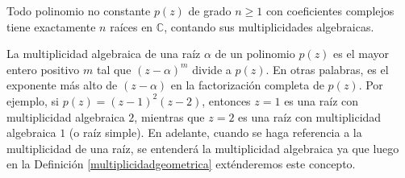 \begin{theorem}\label{tfam}
Todo polinomio no constante $p(z)$ de grado $n \geq 1$ con coeficientes complejos tiene exactamente $n$ raíces en $\mathbb{C}$, contando sus multiplicidades algebraicas.
\end{theorem}

\begin{rem}
La multiplicidad algebraica de una raíz $\alpha$ de un polinomio $p(z)$ es el mayor entero positivo $m$ tal que $(z-\alpha)^m$ divide a $p(z)$. En otras palabras, es el exponente más alto de $(z-\alpha)$ en la factorización completa de $p(z)$. Por ejemplo, si $p(z) = (z-1)^2(z-2)$, entonces $z=1$ es una raíz con multiplicidad algebraica $2$, mientras que $z=2$ es una raíz con multiplicidad algebraica $1$ (o raíz simple). En adelante, cuando se haga referencia a la multiplicidad de una raíz, se entenderá la multiplicidad algebraica ya que luego en la Definición \ref{multiplicidadgeometrica} exténderemos este concepto.
\end{rem}

